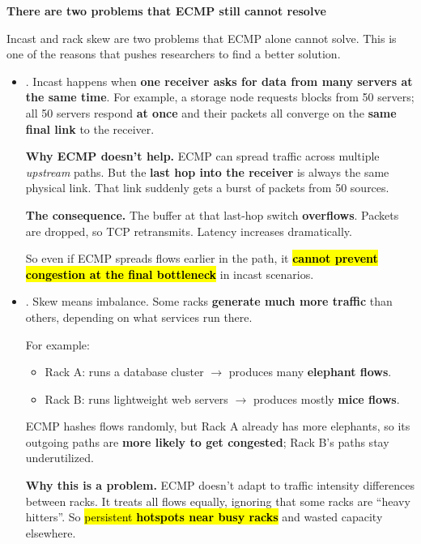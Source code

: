 \newpage

\begin{flushleft}
    \textcolor{Red2}{ \textbf{There are two problems that ECMP still cannot resolve}}
\end{flushleft}
Incast and rack skew are two problems that ECMP alone cannot solve. This is one of the reasons that pushes researchers to find a better solution.
\begin{itemize}
    \item {}. Incast happens when \textbf{one receiver asks for data from many servers at the same time}. For example, a storage node requests blocks from 50 servers; all 50 servers respond \textbf{at once} and their packets all converge on the \textbf{same final link} to the receiver.

    \highspace
    \textcolor{Red2}{ \textbf{Why ECMP doesn't help.}} ECMP can spread traffic across multiple \emph{upstream} paths. But the \textbf{last hop into the receiver} is always the same physical link. That link suddenly gets a burst of packets from 50 sources.

    \highspace
    \textcolor{Red2}{ \textbf{The consequence.}} The buffer at that last-hop switch \textbf{overflows}. Packets are dropped, so TCP retransmits. Latency increases dramatically.

    \highspace
    So even if ECMP spreads flows earlier in the path, it \hl{\textbf{cannot prevent congestion at the final bottleneck}} in incast scenarios.


    \item {}. Skew means imbalance. Some racks \textbf{generate much more traffic} than others, depending on what services run there.
    
    For example:
    \begin{itemize}
        \item Rack A: runs a database cluster $\rightarrow$ produces many \textbf{elephant flows}.
        \item Rack B: runs lightweight web servers $\rightarrow$ produces mostly \textbf{mice flows}.
    \end{itemize}
    ECMP hashes flows randomly, but Rack A already has more elephants, so its outgoing paths are \textbf{more likely to get congested}; Rack B's paths stay underutilized.

    \highspace
    \textcolor{Red2}{ \textbf{Why this is a problem.}} ECMP doesn't adapt to traffic intensity differences between racks. It treats all flows equally, ignoring that some racks are ``heavy hitters''. So \hl{persistent \textbf{hotspots near busy racks}} and wasted capacity elsewhere.
\end{itemize}

